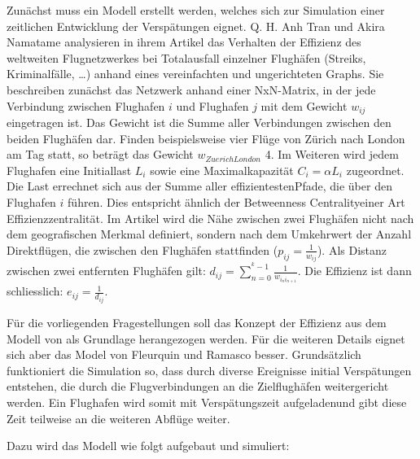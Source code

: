 Zunächst muss ein Modell erstellt werden, welches sich zur Simulation einer zeitlichen Entwicklung der Verspätungen eignet.
Q. H. Anh Tran und Akira Namatame \cite{anh-tran-worldwide-aviation-network} analysieren in ihrem Artikel das Verhalten
der Effizienz des weltweiten Flugnetzwerkes bei Totalausfall einzelner Flughäfen (Streiks, Kriminalfälle, …) anhand eines vereinfachten und ungerichteten Graphs.
Sie beschreiben zunächst das Netzwerk anhand einer NxN-Matrix, in der jede Verbindung zwischen Flughafen $ i $ und Flughafen $ j $
mit dem Gewicht $ w_{ij} $ eingetragen ist.
Das Gewicht ist die Summe aller Verbindungen zwischen den beiden Flughäfen dar.
Finden beispielsweise vier Flüge von Zürich nach London am Tag statt, so beträgt das Gewicht $ w_{Zuerich London}$ 4.
Im Weiteren wird jedem Flughafen eine Initiallast $L_{i}$ sowie eine Maximalkapazität $ C_{i} = \alpha L_{i}$ zugeordnet.
Die Last errechnet sich aus der Summe aller \guillemotleft effizientesten\guillemotright Pfade, die über den Flughafen $i$ führen.
Dies entspricht ähnlich der \guillemotleft Betweenness Centrality\guillemotright einer Art \guillemotleft Effizienzzentralität\guillemotright.
Im Artikel wird die Nähe zwischen zwei Flughäfen nicht nach dem geografischen Merkmal definiert, sondern nach dem Umkehrwert der Anzahl Direktflügen,
die zwischen den Flughäfen stattfinden ($ p_{ij} = \frac{1}{w_{ij}} $).
Als Distanz zwischen zwei entfernten Flughäfen gilt: $ d_{ij} = \sum_{n=0}^{^k-1}\frac{1}{w_{i_{n}i_{n + 1}}}$.
Die Effizienz ist dann schliesslich: $ e_{ij} = \frac{1}{d_{ij}}$.

Für die vorliegenden Fragestellungen soll das Konzept der Effizienz aus dem Modell von\cite{anh-tran-worldwide-aviation-network} als Grundlage herangezogen werden.
Für die weiteren Details eignet sich aber das Model von Fleurquin und Ramasco besser\cite{fleurquin-ramasco}.
Grundsätzlich funktioniert die Simulation so, dass durch diverse Ereignisse initial Verspätungen entstehen, die durch die
Flugverbindungen an die Zielflughäfen weitergericht werden.
Ein Flughafen wird somit mit Verspätungszeit \guillemotleft aufgeladen\guillemotright und gibt diese Zeit teilweise an die weiteren Abflüge weiter.

Dazu wird das Modell wie folgt aufgebaut und simuliert:

